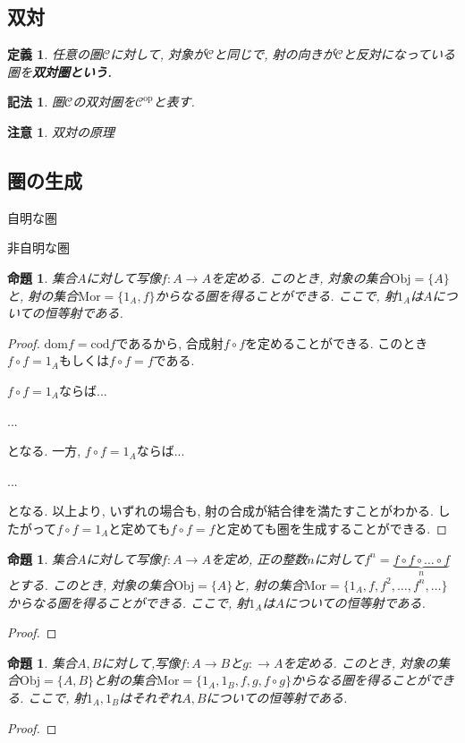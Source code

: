 \documentclass[dvipdfmx]{jsbook}
\theoremstyle{plain}
\newtheorem{Def}[thm]{定義}
\newtheorem{Notation}[thm]{記法}
\newtheorem{Prop}[thm]{命題}
\newtheorem{caution}[thm]{注意}
\begin{document}
\subsection{双対}
\begin{Def}
任意の圏$\mathscr{C}$に対して, 対象が$\mathscr{C}$と同じで, 射の向きが$\mathcal{C}$と反対になっている圏を\bf{双対圏}という.
\end{Def}
\begin{Notation}
圏$\mathscr{C}$の双対圏を$\mathscr{C}^{\mathrm{op}}$と表す.
\end{Notation}
\begin{caution}
双対の原理
\end{caution}
\subsection{圏の生成}
自明な圏

非自明な圏


\begin{Prop}
集合$A$に対して写像$f:A\rightarrow A$を定める.
このとき, 対象の集合$\mathrm{Obj}=\{A\}$と, 射の集合$\mathrm{Mor}=\{1_A,f\}$からなる圏を得ることができる.
ここで, 射$1_A$は$A$についての恒等射である.
\end{Prop}
\begin{proof}
$\mathrm{dom} f=\mathrm{cod}f$であるから, 合成射$f\circ f$を定めることができる.
このとき$f\circ f=1_A$もしくは$f\circ f=f$である.

$f\circ f=1_A$ならば...

...

となる.
一方, $f\circ f=1_A$ならば...

...

となる.
以上より, いずれの場合も, 射の合成が結合律を満たすことがわかる.
したがって$f\circ f=1_A$と定めても$f\circ f=f$と定めても圏を生成することができる.
\end{proof}
\begin{Prop}
集合$A$に対して写像$f:A\rightarrow A$を定め, 正の整数$n$に対して$f^n=\underbrace{f\circ f \circ \dots \circ f}_{n}$
とする.
このとき, 対象の集合$\mathrm{Obj}=\{A\}$と, 射の集合$\mathrm{Mor}=\{1_A,f,f^2,\dots,f^n,\dots\}$からなる圏を得ることができる.
ここで, 射$1_A$は$A$についての恒等射である.
\end{Prop}
\begin{proof}
\end{proof}
\begin{Prop}
集合$A,B$に対して,写像$f:A\rightarrow B$と$g:\rightarrow A$を定める.
このとき, 対象の集合$\mathrm{Obj}=\{A,B\}$と射の集合$\mathrm{Mor}=\{1_A,1_B,f,g,f\circ g\}$からなる圏を得ることができる.
ここで, 射$1_A,1_B$はそれぞれ$A,B$についての恒等射である.
\end{Prop}
\begin{proof}
\end{proof}
\end{document}
